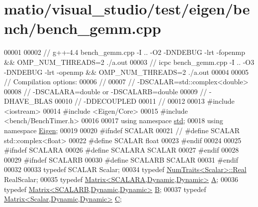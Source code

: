 \hypertarget{matio_2visual__studio_2test_2eigen_2bench_2bench__gemm_8cpp_source}{}\section{matio/visual\+\_\+studio/test/eigen/bench/bench\+\_\+gemm.cpp}
\label{matio_2visual__studio_2test_2eigen_2bench_2bench__gemm_8cpp_source}

\begin{DoxyCode}
00001 
00002 \textcolor{comment}{// g++-4.4 bench\_gemm.cpp -I .. -O2 -DNDEBUG -lrt -fopenmp && OMP\_NUM\_THREADS=2  ./a.out}
00003 \textcolor{comment}{// icpc bench\_gemm.cpp -I .. -O3 -DNDEBUG -lrt -openmp  && OMP\_NUM\_THREADS=2  ./a.out}
00004 
00005 \textcolor{comment}{// Compilation options:}
00006 \textcolor{comment}{// }
00007 \textcolor{comment}{// -DSCALAR=std::complex<double>}
00008 \textcolor{comment}{// -DSCALARA=double or -DSCALARB=double}
00009 \textcolor{comment}{// -DHAVE\_BLAS}
00010 \textcolor{comment}{// -DDECOUPLED}
00011 \textcolor{comment}{//}
00012 
00013 \textcolor{preprocessor}{#include <iostream>}
00014 \textcolor{preprocessor}{#include <Eigen/Core>}
00015 \textcolor{preprocessor}{#include <bench/BenchTimer.h>}
00016 
00017 \textcolor{keyword}{using namespace }\hyperlink{namespacestd}{std};
00018 \textcolor{keyword}{using namespace }\hyperlink{namespace_eigen}{Eigen};
00019 
00020 \textcolor{preprocessor}{#ifndef SCALAR}
00021 \textcolor{comment}{// #define SCALAR std::complex<float>}
00022 \textcolor{preprocessor}{#define SCALAR float}
00023 \textcolor{preprocessor}{#endif}
00024 
00025 \textcolor{preprocessor}{#ifndef SCALARA}
00026 \textcolor{preprocessor}{#define SCALARA SCALAR}
00027 \textcolor{preprocessor}{#endif}
00028 
00029 \textcolor{preprocessor}{#ifndef SCALARB}
00030 \textcolor{preprocessor}{#define SCALARB SCALAR}
00031 \textcolor{preprocessor}{#endif}
00032 
00033 \textcolor{keyword}{typedef} SCALAR Scalar;
00034 \textcolor{keyword}{typedef} \hyperlink{group___core___module_struct_eigen_1_1_num_traits}{NumTraits<Scalar>::Real} RealScalar;
00035 \textcolor{keyword}{typedef} \hyperlink{group___core___module_class_eigen_1_1_matrix}{Matrix<SCALARA,Dynamic,Dynamic>} \hyperlink{group___core___module_class_eigen_1_1_matrix}{A};
00036 \textcolor{keyword}{typedef} \hyperlink{group___core___module_class_eigen_1_1_matrix}{Matrix<SCALARB,Dynamic,Dynamic>} \hyperlink{group___core___module_class_eigen_1_1_matrix}{B};
00037 \textcolor{keyword}{typedef} \hyperlink{group___core___module}{Matrix<Scalar,Dynamic,Dynamic>} \hyperlink{group___core___module}{C};

\end{DoxyCode}
